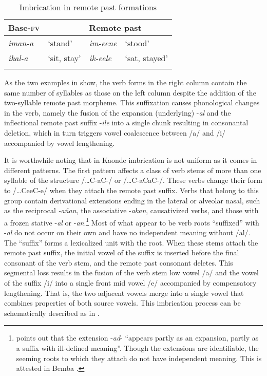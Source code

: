 \documentclass[output=paper]{langsci/langscibook}
\begin{document}
\begin{table}
\begin{tabularx}{.75\textwidth}{lXlX}
\lsptoprule
Base-\textsc{fv} &  & \multicolumn{2}{l}{Remote past} \\
\midrule
\textit{iman-a} & `stand' & \textit{im-eene} & `stood' \\
\textit{ikal-a} & `sit, stay' & \textit{ik-eele} & `sat, stayed' \\

\lspbottomrule
\end{tabularx}

\caption{Imbrication in remote past formations}
\label{tab:19.kawasha}

\end{table}

As the two examples in  show, the verb forms in the right column contain the same number of syllables as those on the left column despite the addition of the two-syllable remote past morpheme. This suffixation causes phonological changes in the verb, namely the fusion of the expansion (underlying) -\textit{al} and the inflectional remote past suffix -\textit{ile} into a single chunk resulting in consonantal deletion, which in turn triggers vowel coalescence between /a/ and /i/ accompanied by vowel lengthening. 

It is worthwhile noting that in Kaonde imbrication is not uniform as it comes in different patterns. The first pattern affects a class of verb stems of more than one syllable of the structure /…C-aC-/ or /…C-aCaC-/. These verbs change their form to /…CeeC-e/ when they attach the remote past suffix. Verbs that belong to this group contain derivational extensions ending in the lateral or alveolar nasal, such as the reciprocal \textit{-añan}, the associative -\textit{akan}, causativized verbs, and those with a frozen stative -\textit{al} or -\textit{an}.\footnote{\citet[90]{meeussen1967} points out that the extension -\textit{ad}- “appears partly as an expansion, partly as a suffix with ill-defined meaning”. Though the extensions are identifiable, the seeming roots to which they attach do not have independent meaning. This is attested in Bemba \citep{hyman1995}.} Most of what appear to be verb roots “suffixed” with -\textit{al} do not occur on their own and have no independent meaning without /al/. The “suffix” forms a lexicalized unit with the root. When these stems attach the remote past suffix, the initial vowel of the suffix is inserted before the final consonant of the verb stem, and the remote past consonant deletes. This segmental loss results in the fusion of the verb stem low vowel /a/ and the vowel of the suffix /i/ into a single front mid vowel /e/ accompanied by compensatory lengthening. That is, the two adjacent vowels merge into a single vowel that combines properties of both source vowels. This imbrication process can be schematically described as in .
\end{document}
